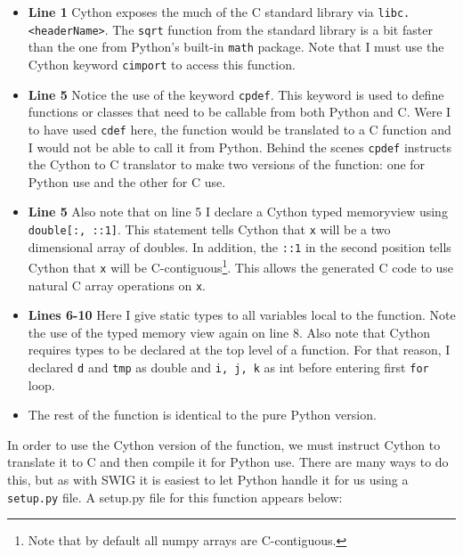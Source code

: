    \begin{itemize}
      \item \textbf{Line 1} Cython exposes the much of the C standard library via \texttt{libc.<headerName>}. The \texttt{sqrt} function from the standard library is a bit faster than the one from Python's built-in \texttt{math} package. Note that I must use the Cython keyword \texttt{cimport} to access this function.
      \item \textbf{Line 5} Notice the use of the keyword \texttt{cpdef}. This keyword is used to define functions or classes that need to be callable from both Python and C. Were I to have used \texttt{cdef} here, the function would be translated to a C function and I would not be able to call it from Python. Behind the scenes \texttt{cpdef} instructs the Cython to C translator to make two versions of the function: one for Python use and the other for C use.
      \item \textbf{Line 5} Also note that on line 5 I declare a Cython typed memoryview using \texttt{double[:, ::1]}. This statement tells Cython that \texttt{x} will be a two dimensional array of doubles. In addition, the \texttt{::1} in the second position tells Cython that \texttt{x} will be C-contiguous\footnote{Note that by default all numpy arrays are C-contiguous.}. This allows the generated C code to use natural C array operations on \texttt{x}.
      \item \textbf{Lines 6-10} Here I give static types to all variables local to the function. Note the use of the typed memory view again on line 8. Also note that Cython requires types to be declared at the top level of a function. For that reason, I declared \texttt{d} and \texttt{tmp} as double and \texttt{i, j, k} as int before entering first \texttt{for} loop.
      \item The rest of the function is identical to the pure Python version.
    \end{itemize}

    \mainstretch{}
    \noindent In order to use the Cython version of the function, we must instruct Cython to translate it to C and then compile it for Python use. There are many ways to do this, but as with SWIG it is easiest to let Python handle it for us using a \texttt{setup.py} file. A setup.py file for this function appears below:

    \vspace{.2in}
    
    \mainstretch{}

